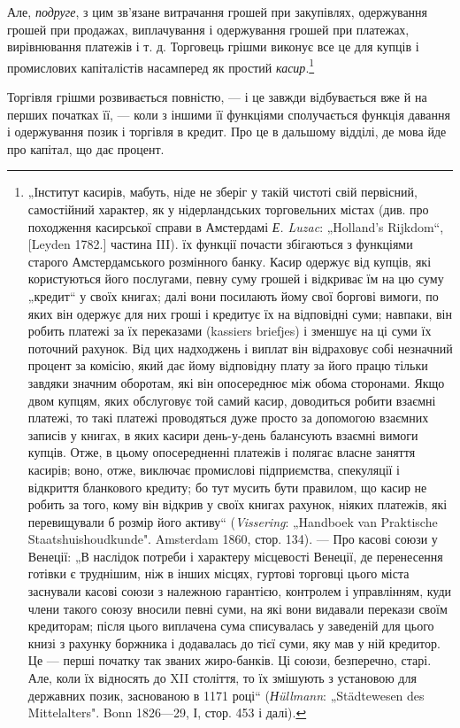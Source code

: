 Але, \emph{подруге}, з цим зв’язане витрачання грошей при закупівлях,
одержування грошей при продажах, виплачування і одержування
грошей при платежах, вирівнювання платежів і т. д.
Торговець грішми виконує все це для купців і промислових
капіталістів насамперед як простий \emph{касир}.\footnote{
„Інститут касирів, мабуть, ніде не зберіг у такій чистоті свій первісний,
самостійний характер, як у нідерландських торговельних містах (див. про
походження касирської справи в Амстердамі \emph{Е. Luzac}: „Holland’s Rijkdom“,
[Leyden 1782.] частина III). їх функції почасти збігаються з функціями старого
Амстердамського розмінного банку. Касир одержує від купців, які користуються
його послугами, певну суму грошей і відкриває їм на цю суму „кредит“
у своїх книгах; далі вони посилають йому свої боргові вимоги, по яких він
одержує для них гроші і кредитує їх на відповідні суми; навпаки, він робить
платежі за їх переказами (kassiers briefjes) і зменшує на ці суми їх поточний
рахунок. Від цих надходжень і виплат він відраховує собі незначний процент
за комісію, який дає йому відповідну плату за його працю тільки завдяки
значним оборотам, які він опосереднює між обома сторонами. Якщо двом купцям,
яких обслуговує той самий касир, доводиться робити взаємні платежі, то
такі платежі проводяться дуже просто за допомогою взаємних записів у книгах,
в яких касири день-у-день балансують взаємні вимоги купців. Отже, в цьому
опосередненні платежів і полягає власне заняття касирів; воно, отже, виключає
промислові підприємства, спекуляції і відкриття бланкового кредиту; бо тут
мусить бути правилом, що касир не робить за того, кому він відкрив у своїх
книгах рахунок, ніяких платежів, які перевищували б розмір його активу“
(\emph{Vissering}: „Handboek van Praktische Staatshuishoudkunde". Amsterdam 1860,
стор. 134). — Про касові союзи у Венеції: „В наслідок потреби і характеру
місцевості Венеції, де перенесення готівки є труднішим, ніж в інших місцях,
гуртові торговці цього міста заснували касові союзи з належною гарантією,
контролем і управлінням, куди члени такого союзу вносили певні суми, на
які вони видавали перекази своїм кредиторам; після цього виплачена сума
списувалась у заведеній для цього книзі з рахунку боржника і додавалась до
тієї суми, яку мав у ній кредитор. Це — перші початку так званих жиро-банків.
Ці союзи, безперечно, старі. Але, коли їх відносять до XII століття, то їх
змішують з установою для державних позик, заснованою в 1171 році“ (\emph{Нüllmann}:
„Städtewesen des Mittelalters". Bonn 1826—29, І, стор. 453 і далі).
}

Торгівля грішми розвивається повністю, — і це завжди відбувається
вже й на перших початках її, — коли з іншими її функціями
сполучається функція давання і одержування позик і торгівля
в кредит. Про це в дальшому відділі, де мова йде про капітал,
що дає процент.
